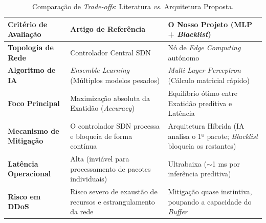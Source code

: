 \begin{table}[htbp]
    \centering
    \caption{Comparação de \textit{Trade-offs}: Literatura \textit{vs.} Arquitetura Proposta.}
    \label{tab:comparacao_literatura}
    \renewcommand{\arraystretch}{1.4} %
    \begin{tabular}{|p{3.5cm}|p{5cm}|p{5cm}|}
        \hline
        \textbf{Critério de Avaliação} & \textbf{Artigo de Referência \cite{EnsembleSDN2020}} & \textbf{O Nosso Projeto (MLP + \textit{Blacklist})} \\
        \hline
        \textbf{Topologia de Rede} & Controlador Central SDN & Nó de \textit{Edge Computing} autónomo \\
        \hline
        \textbf{Algoritmo de IA} & \textit{Ensemble Learning} (Múltiplos modelos pesados) & \textit{Multi-Layer Perceptron} (Cálculo matricial rápido) \\
        \hline
        \textbf{Foco Principal} & Maximização absoluta da Exatidão (\textit{Accuracy}) & Equilíbrio ótimo entre Exatidão preditiva e Latência \\
        \hline
        \textbf{Mecanismo de Mitigação} & O controlador SDN processa e bloqueia de forma contínua & Arquitetura Híbrida (IA analisa o 1º pacote; \textit{Blacklist} bloqueia os restantes) \\
        \hline
        \textbf{Latência Operacional} & Alta (inviável para processamento de pacotes individuais) & Ultrabaixa ($\sim$1 ms por inferência preditiva) \\
        \hline
        \textbf{Risco em DDoS} & Risco severo de exaustão de recursos e estrangulamento da rede & Mitigação quase instintiva, poupando a capacidade do \textit{Buffer} \\
        \hline
    \end{tabular}
\end{table}
